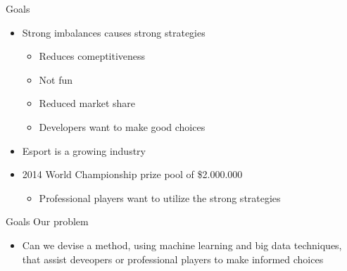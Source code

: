 \begin{frame}{Goals}
	\begin{itemize}
		\item Strong imbalances causes strong strategies
			\begin{itemize}
			\item Reduces comeptitiveness
			\item Not fun
			\item Reduced market share 
			\item Developers want to make good choices
			\end{itemize}
		
	\end{itemize}

	\begin{itemize}
		\item Esport is a growing industry
		\item 2014 World Championship prize pool of \$2.000.000 
		\begin{itemize}
			\item Professional players want to utilize the strong strategies
		\end{itemize}
	\end{itemize}
	
\end{frame}

\begin{frame}{Goals}
	Our problem
	\begin{itemize}
			\item Can we devise a method, using machine learning and big data techniques, that assist deveopers or professional players to make informed choices
	\end{itemize}
\end{frame}
